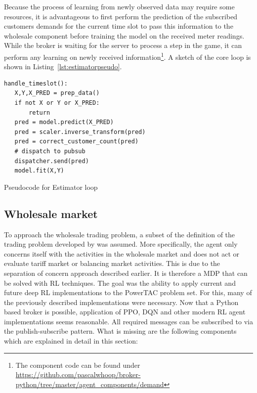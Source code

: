 Because the process of learning from newly observed data may require some resources, it is advantageous to
first perform the prediction of the subscribed customers demands for the current time slot to pass this information to
the wholesale component before training the model on the received meter readings. While the broker is waiting for the
server to process a step in the game, it can perform any learning on newly received information\footnote{The component code can be
found under \url{https://github.com/pascalwhoop/broker-python/tree/master/agent_components/demand}}. A sketch of the
core loop is shown in Listing~\ref{lst:estimatorpseudo}.

\begin{listing}
    \begin{verbatim}
handle_timeslot():
   X,Y,X_PRED = prep_data()
   if not X or Y or X_PRED:
       return
   pred = model.predict(X_PRED)
   pred = scaler.inverse_transform(pred)
   pred = correct_customer_count(pred)
   # dispatch to pubsub
   dispatcher.send(pred)
   model.fit(X,Y)
    \end{verbatim}
    \caption{Pseudocode for Estimator loop}
    \label{lst:estimatorpseudo}
\end{listing}




\subsection{Wholesale market}
\label{sec:wholesale_market}

To approach the wholesale trading problem, a subset of the definition of the trading problem developed by
\citet{tactexurieli2016mdp} was assumed. More specifically, the agent only concerns itself with the activities in the
wholesale market and does not act or evaluate tariff market or balancing market activities. This is due to the
separation of concern approach described earlier. It is therefore a \ac{MDP} that can be solved with \ac{RL} techniques.
The goal was the ability to apply current and future deep \ac{RL} implementations to the \ac{PowerTAC} problem set. For this,
many of the previously described implementations were necessary. Now that a Python based broker is possible, application
of \ac{PPO}, \ac{DQN} and other modern \ac{RL} agent implementations seems reasonable. All required messages can be
subscribed to via the publish-subscribe pattern. What is missing are the following components which are explained in
detail in this section:

